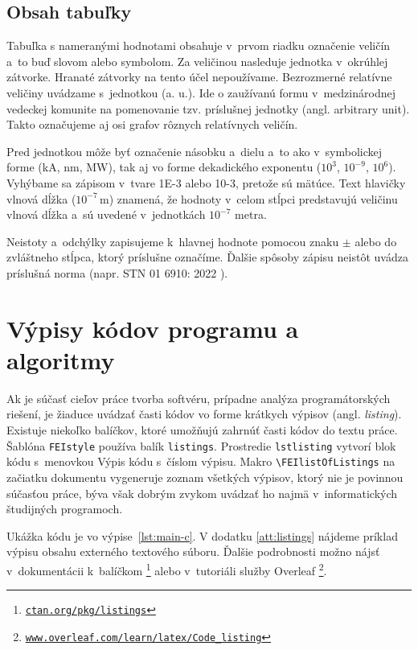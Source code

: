 \subsection{Obsah tabuľky}
Tabuľka s nameranými hodnotami obsahuje v~prvom riadku označenie
veličín a~to buď slovom alebo symbolom.
Za veličinou nasleduje jednotka v~okrúhlej zátvorke.
Hranaté zátvorky na tento účel nepoužívame.
Bezrozmerné relatívne veličiny uvádzame s~jednotkou (a. u.).
Ide o zaužívanú formu v~medzinárodnej vedeckej komunite na pomenovanie tzv. príslušnej jednotky (angl. \foreignlanguage{english}{arbitrary unit}).
Takto označujeme aj osi grafov rôznych relatívnych veličín.

Pred jednotkou môže byť označenie násobku
a~dielu a~to ako v~symbolickej forme (kA, nm, MW),
tak aj vo forme dekadického exponentu ($10^3$, $10^{-9}$, $10^6$).
Vyhýbame sa zápisom v~tvare 1E-3 alebo 10-3,
pretože sú mätúce.
Text hlavičky vlnová dĺžka ($10^{-7}$\,m) znamená,
že hodnoty v~celom stĺpci predstavujú veličinu vlnová dĺžka
a~sú uvedené v~jednotkách $10^{-7}$ metra.

Neistoty a~odchýlky zapisujeme k~hlavnej hodnote pomocou
znaku $\pm$ alebo do zvláštneho stĺpca,
ktorý príslušne označíme.
Ďalšie spôsoby zápisu neistôt uvádza príslušná norma (napr. STN 01 6910: 2022 \cite{stn016910}).

\section{Výpisy kódov programu a algoritmy}
\label{sec:listings}
Ak je súčasť cieľov práce tvorba softvéru, prípadne analýza programátorských riešení,
je žiaduce uvádzať časti kódov vo forme krátkych výpisov (angl. \foreignlanguage{english}{\emph{listing}}).
Existuje niekoľko balíčkov, ktoré umožňujú zahrnúť časti kódov do textu práce.
Šablóna \verb|FEIstyle| používa balík \verb|listings|.
Prostredie \verb|lstlisting| vytvorí blok kódu s~menovkou Výpis kódu s~číslom výpisu.
Makro \verb|\FEIlistOfListings| na začiatku dokumentu vygeneruje zoznam všetkých výpisov,
ktorý nie je povinnou súčasťou práce,
býva však dobrým zvykom uvádzať ho najmä v~informatických študijných programoch.

Ukážka kódu je vo výpise~\ref{lst:main-c}.
V dodatku \ref{att:listings} nájdeme príklad výpisu obsahu externého textového súboru.
Ďalšie podrobnosti možno nájsť v~dokumentácii k~balíčkom%
\footnote{\href{https://ctan.org/pkg/listings}{\texttt{ctan.org/pkg/listings}}}
alebo v~tutoriáli služby Overleaf%
\footnote{\texttt{\href{https://www.overleaf.com/learn/latex/Code_listing}{www.overleaf.com/learn/latex/Code\_listing}}}.

